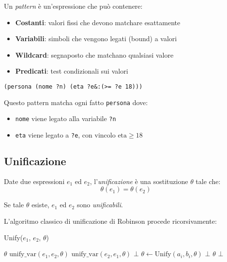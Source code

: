Un \textit{pattern} è un'espressione che può contenere:

\begin{itemize}
\item \textbf{Costanti}: valori fissi che devono matchare esattamente
\item \textbf{Variabili}: simboli che vengono legati (bound) a valori
\item \textbf{Wildcard}: segnaposto che matchano qualsiasi valore
\item \textbf{Predicati}: test condizionali sui valori
\end{itemize}

\begin{esempio}
\begin{lstlisting}[language=CLIPS]
(persona (nome ?n) (eta ?e&:(>= ?e 18)))
\end{lstlisting}

Questo pattern matcha ogni fatto \texttt{persona} dove:
\begin{itemize}
\item \texttt{nome} viene legato alla variabile \texttt{?n}
\item \texttt{eta} viene legato a \texttt{?e}, con vincolo $\text{eta} \geq 18$
\end{itemize}
\end{esempio}

\subsection{Unificazione}

\begin{definizione}[Unificazione]
Date due espressioni $e_1$ ed $e_2$, l'\textit{unificazione} è una sostituzione $\theta$ tale che:
\begin{equation}
\theta(e_1) = \theta(e_2)
\end{equation}

Se tale $\theta$ esiste, $e_1$ ed $e_2$ sono \textit{unificabili}.
\end{definizione}

L'algoritmo classico di unificazione di Robinson procede ricorsivamente:

\begin{algorithm}[H]
\caption{Unify($e_1$, $e_2$, $\theta$)}
\begin{algorithmic}[1]
    \State \Return $\theta$ 
    \State \Return $\text{unify\_var}(e_1, e_2, \theta)$
    \State \Return $\text{unify\_var}(e_2, e_1, \theta)$
        \State \Return $\bot$ 
    \Else
            \State $\theta \gets \text{Unify}(a_i, b_i, \theta)$
            \If{$\theta = \bot$}
                \State \Return $\bot$
            \EndIf
        \EndFor
        \State \Return $\theta$
    \EndIf
\Else
    \State \Return $\bot$ 
\EndIf
\end{algorithmic}
\end{algorithm}

